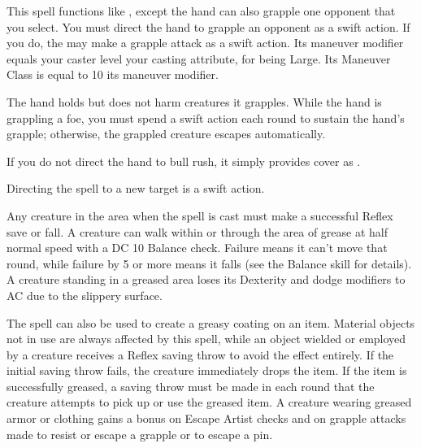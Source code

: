 \begin{spelleffect}
  This spell functions like , except the hand can also grapple one opponent that you select. You must direct the hand to grapple an opponent as a swift action. If you do, the  may make a grapple attack as a swift action. Its maneuver modifier equals your caster level \add your casting attribute,  for being Large. Its Maneuver Class is equal to 10 \add its maneuver modifier.
  \par The hand holds but does not harm creatures it grapples. While the hand is grappling a foe, you must spend a swift action each round to sustain the hand's grapple; otherwise, the grappled creature escapes automatically.
  \par If you do not direct the hand to bull rush, it simply provides cover as .
\end{spelleffect}
\begin{spellnotes}
  Directing the spell to a new target is a swift action.
\end{spellnotes}

\spellrng{\rngclose}
\begin{spelleffect}
  Any creature in the area when the spell is cast must make a successful Reflex save or fall. A creature can walk within or through the area of grease at half normal speed with a DC 10 Balance check. Failure means it can't move that round, while failure by 5 or more means it falls (see the Balance skill for details). A creature standing in a greased area loses its Dexterity and dodge modifiers to AC due to the slippery surface.
  \par The spell can also be used to create a greasy coating on an item. Material objects not in use are always affected by this spell, while an object wielded or employed by a creature receives a Reflex saving throw to avoid the effect entirely. If the initial saving throw fails, the creature immediately drops the item. If the item is successfully greased, a saving throw must be made in each round that the creature attempts to pick up or use the greased item. A creature wearing greased armor or clothing gains a  bonus on Escape Artist checks and on grapple attacks made to resist or escape a grapple or to escape a pin.
\end{spelleffect}

